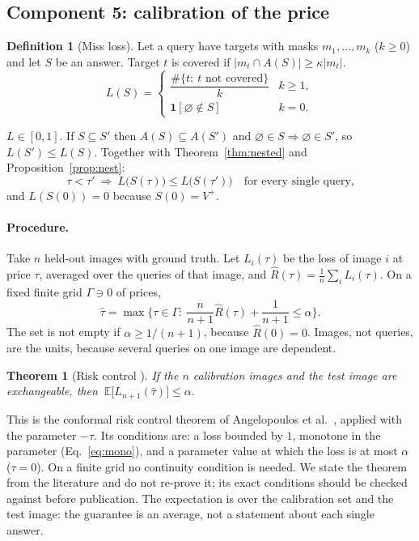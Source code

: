 \documentclass[11pt,a4paper]{article}
\newtheorem{theorem}{Theorem}
\theoremstyle{definition}
\newtheorem{definition}{Definition}
\theoremstyle{remark}
\newcommand{\nul}{\varnothing}
\begin{document}
\subsection{Component 5: calibration of the price}
\label{sec:calib}
\begin{definition}[Miss loss]\label{def:loss}
Let a query have targets with masks $m_1,\dots,m_k$ ($k\ge0$) and let $S$ be an answer. Target $t$ is covered if
$|m_t\cap A(S)|\ge\kappa|m_t|$.
\[
L(S)=\begin{cases}\dfrac{\#\{t:\ t\text{ not covered}\}}{k}&k\ge1,\\[8pt] \mathbf{1}[\nul\notin S]&k=0.\end{cases}
\]
\end{definition}
$L\in[0,1]$. If $S\subseteq S'$ then $A(S)\subseteq A(S')$ and $\nul\in S\Rightarrow\nul\in S'$, so
$L(S')\le L(S)$. Together with Theorem~\ref{thm:nested} and Proposition~\ref{prop:nest}:
\begin{equation}\label{eq:mono}
\tau<\tau'\ \Longrightarrow\ L\big(S(\tau)\big)\le L\big(S(\tau')\big)\quad\text{for every single query,}
\end{equation}
and $L(S(0))=0$ because $S(0)=V^+$.

\paragraph{Procedure.} Take $n$ held-out images with ground truth. Let $L_i(\tau)$ be the loss of image $i$ at price
$\tau$, averaged over the queries of that image, and $\hat R(\tau)=\frac1n\sum_iL_i(\tau)$. On a fixed finite grid
$\Gamma\ni0$ of prices,
\begin{equation}\label{eq:tauhat}
\hat\tau=\max\Big\{\tau\in\Gamma:\ \frac{n}{n+1}\hat R(\tau)+\frac{1}{n+1}\le\alpha\Big\}.
\end{equation}
The set is not empty if $\alpha\ge1/(n+1)$, because $\hat R(0)=0$. Images, not queries, are the units, because
several queries on one image are dependent.

\begin{theorem}[Risk control {\cite{crc}}]\label{thm:crc}
If the $n$ calibration images and the test image are exchangeable, then
$\ \mathbb{E}\big[L_{n+1}(\hat\tau)\big]\le\alpha .$
\end{theorem}
\noindent This is the conformal risk control theorem of Angelopoulos et al.\ \cite{crc}, applied with the parameter
$-\tau$. Its conditions are: a loss bounded by $1$, monotone in the parameter (Eq.~\ref{eq:mono}), and a parameter
value at which the loss is at most $\alpha$ ($\tau=0$). On a finite grid no continuity condition is needed. We state
the theorem from the literature and do not re-prove it; its exact conditions should be checked against \cite{crc}
before publication. The expectation is over the calibration set and the test image: the guarantee is an average,
not a statement about each single answer.
\end{document}
